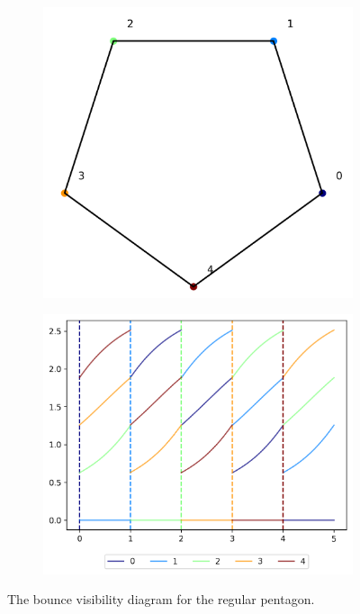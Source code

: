 \documentclass[letterpaper, 10 pt, conference]{ieeeconf}  %
\begin{document}
\begin{figure}
\begin{subfigure}{0.25\textwidth}
\centering
\includegraphics[width=0.5\linewidth]{images/regular_pent.png}
\end{subfigure}
\begin{subfigure}{0.25\textwidth}
\includegraphics[width=0.8\linewidth]{images/regular_pent_bvd.png}
\end{subfigure}
\centering
\caption{The bounce visibility diagram for the regular pentagon. }
\label{fig:regular_pent_bvd}
\end{figure}
\end{document}
